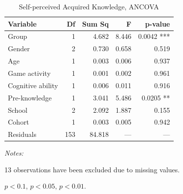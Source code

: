 \begin{table}[htbp]
\centering
\caption{Self-perceived Acquired Knowledge, ANCOVA}
\label{tab:ancova18}
\begin{tabular}{lrrrr}
\hline
\textbf{Variable} & \textbf{Df} & \textbf{Sum Sq} & \textbf{F} & \textbf{p-value} \\
\hline
Group & 1 & 4.682 & 8.446 & 0.0042 *** \\
Gender & 2 & 0.730 & 0.658 & 0.519 \\
Age & 1 & 0.003 & 0.006 & 0.937 \\
Game activity & 1 & 0.001 & 0.002 & 0.961 \\
Cognitive ability & 1 & 0.006 & 0.011 & 0.916 \\
Pre-knowledge & 1 & 3.041 & 5.486 & 0.0205 ** \\
School & 2 & 2.092 & 1.887 & 0.155 \\
Cohort & 1 & 0.003 & 0.005 & 0.942 \\
Residuals & 153 & 84.818 & --- & --- \\
\hline
\end{tabular}
{\begin{flushleft}\parbox{\textwidth}{\tiny \hspace*{0.1cm}
\textit{Notes:}} 13 observations have been excluded due to missing values.
\item \sym{*} $p<0.1$, \sym{**} $p<0.05$, \sym{***} $p<0.01$.
\end{flushleft}}
\end{table}
